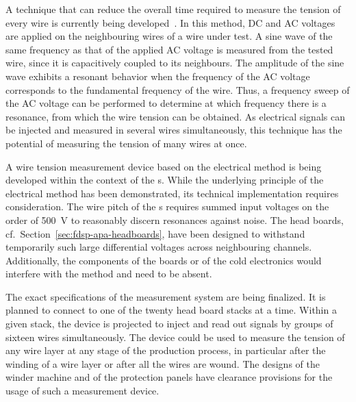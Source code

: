 A technique that can reduce the overall time required to measure the tension of every wire is currently being developed~\cite{Garcia-Gamez:2018frz}. In this method, DC and AC voltages are applied on the neighbouring wires of a wire under test. A sine wave of the same frequency as that of the applied AC voltage is measured from the tested wire, since it is capacitively coupled to its neighbours. The amplitude of the sine wave exhibits a resonant behavior when the frequency of the AC voltage corresponds to the fundamental frequency of the wire. Thus, a frequency sweep of the AC voltage can be performed to determine at which frequency there is a resonance, from which the wire tension can be obtained. As electrical signals can be injected and measured in several wires simultaneously, this technique has the potential of measuring the tension of many wires at once.

A wire tension measurement device based on the electrical method is being developed within the context of the  s. While the underlying principle of the electrical method has been demonstrated, its technical implementation requires consideration. The wire pitch of the s requires summed input voltages on the order of \SI{500}{V} to reasonably discern resonances against noise. The head boards, cf.\ Section~\ref{sec:fdsp-apa-headboards}, have been designed to withstand temporarily such large differential voltages across neighbouring channels. Additionally, the components of the  boards or of the cold electronics would interfere with the method and need to be absent.

The exact specifications of the measurement system are being finalized. It is planned to connect to one of the twenty head board stacks at a time. Within a given stack, the device is projected to inject and read out signals by groups of sixteen wires simultaneously. The device could be used to measure the tension of any wire layer at any stage of the production process, in particular after the winding of a wire layer or after all the wires are wound. The designs of the winder machine and of the  protection panels have clearance provisions for the usage of such a measurement device.


